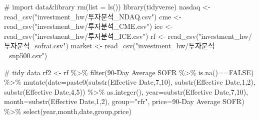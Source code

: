 \documentclass[
  a4paper,
  DIV=11,
  numbers=noendperiod]{scrreprt}
\newenvironment{Shaded}{\begin{snugshade}}{\end{snugshade}}
\newcommand{\AttributeTok}[1]{\textcolor[rgb]{0.40,0.45,0.13}{#1}}
\newcommand{\CommentTok}[1]{\textcolor[rgb]{0.37,0.37,0.37}{#1}}
\newcommand{\ConstantTok}[1]{\textcolor[rgb]{0.56,0.35,0.01}{#1}}
\newcommand{\DecValTok}[1]{\textcolor[rgb]{0.68,0.00,0.00}{#1}}
\newcommand{\FunctionTok}[1]{\textcolor[rgb]{0.28,0.35,0.67}{#1}}
\newcommand{\NormalTok}[1]{\textcolor[rgb]{0.00,0.23,0.31}{#1}}
\newcommand{\OtherTok}[1]{\textcolor[rgb]{0.00,0.23,0.31}{#1}}
\newcommand{\SpecialCharTok}[1]{\textcolor[rgb]{0.37,0.37,0.37}{#1}}
\newcommand{\StringTok}[1]{\textcolor[rgb]{0.13,0.47,0.30}{#1}}
\begin{document}
\begin{Shaded}
\begin{Highlighting}[]
\CommentTok{\# import data\&library}
\FunctionTok{rm}\NormalTok{(}\AttributeTok{list =} \FunctionTok{ls}\NormalTok{())}
\FunctionTok{library}\NormalTok{(tidyverse)}
\NormalTok{nasdaq }\OtherTok{\textless{}{-}} \FunctionTok{read\_csv}\NormalTok{(}\StringTok{"investment\_hw/투자분석\_NDAQ.csv"}\NormalTok{)}
\NormalTok{cme }\OtherTok{\textless{}{-}} \FunctionTok{read\_csv}\NormalTok{(}\StringTok{"investment\_hw/투자분석\_CME.csv"}\NormalTok{)}
\NormalTok{ice }\OtherTok{\textless{}{-}} \FunctionTok{read\_csv}\NormalTok{(}\StringTok{"investment\_hw/투자분석\_ICE.csv"}\NormalTok{)}
\NormalTok{rf }\OtherTok{\textless{}{-}} \FunctionTok{read\_csv}\NormalTok{(}\StringTok{"investment\_hw/투자분석\_sofrai.csv"}\NormalTok{)}
\NormalTok{market }\OtherTok{\textless{}{-}} \FunctionTok{read\_csv}\NormalTok{(}\StringTok{"investment\_hw/투자분석\_snp500.csv"}\NormalTok{)}

\CommentTok{\# tidy data}
\NormalTok{rf2 }\OtherTok{\textless{}{-}}\NormalTok{ rf }\SpecialCharTok{\%\textgreater{}\%} 
  \FunctionTok{filter}\NormalTok{(}\StringTok{\textasciigrave{}}\AttributeTok{90{-}Day Average SOFR}\StringTok{\textasciigrave{}} \SpecialCharTok{\%\textgreater{}\%} \FunctionTok{is.na}\NormalTok{()}\SpecialCharTok{==}\ConstantTok{FALSE}\NormalTok{) }\SpecialCharTok{\%\textgreater{}\%} 
  \FunctionTok{mutate}\NormalTok{(}\AttributeTok{date=}\FunctionTok{paste0}\NormalTok{(}\FunctionTok{substr}\NormalTok{(}\StringTok{\textasciigrave{}}\AttributeTok{Effective Date}\StringTok{\textasciigrave{}}\NormalTok{,}\DecValTok{7}\NormalTok{,}\DecValTok{10}\NormalTok{),}
                     \FunctionTok{substr}\NormalTok{(}\StringTok{\textasciigrave{}}\AttributeTok{Effective Date}\StringTok{\textasciigrave{}}\NormalTok{,}\DecValTok{1}\NormalTok{,}\DecValTok{2}\NormalTok{),}
                     \FunctionTok{substr}\NormalTok{(}\StringTok{\textasciigrave{}}\AttributeTok{Effective Date}\StringTok{\textasciigrave{}}\NormalTok{,}\DecValTok{4}\NormalTok{,}\DecValTok{5}\NormalTok{)) }\SpecialCharTok{\%\textgreater{}\%} \FunctionTok{as.integer}\NormalTok{(),}
         \AttributeTok{year=}\FunctionTok{substr}\NormalTok{(}\StringTok{\textasciigrave{}}\AttributeTok{Effective Date}\StringTok{\textasciigrave{}}\NormalTok{,}\DecValTok{7}\NormalTok{,}\DecValTok{10}\NormalTok{),}
         \AttributeTok{month=}\FunctionTok{substr}\NormalTok{(}\StringTok{\textasciigrave{}}\AttributeTok{Effective Date}\StringTok{\textasciigrave{}}\NormalTok{,}\DecValTok{1}\NormalTok{,}\DecValTok{2}\NormalTok{),}
         \AttributeTok{group=}\StringTok{"rfr"}\NormalTok{,}
         \AttributeTok{price=}\StringTok{\textasciigrave{}}\AttributeTok{90{-}Day Average SOFR}\StringTok{\textasciigrave{}}\NormalTok{) }\SpecialCharTok{\%\textgreater{}\%} 
  \FunctionTok{select}\NormalTok{(year,month,date,group,price)}


\end{Highlighting}
\end{Shaded}
\end{document}
